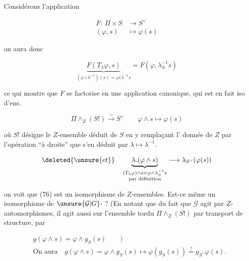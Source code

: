 
Considérons l'application

\[
\begin{aligned}
F:\ \Pi\times S&\longrightarrow S^\vee\\
(\varphi,s)&\longmapsto\varphi(s)
\end{aligned}
\]

on aura donc

\[
\underbrace{F(T_\lambda\varphi,s)}_{(\varphi\circ\lambda^{-1})(s)=\varphi(\lambda^{-1}s}
=F(\varphi,\lambda_S^{-1}s)
\]

ce qui montre que $F$ se factorise en une application canonique, qui est en fait iso d'ens.

\[
\Pi\wedge_Z(S!)\xrightarrow{\sim} S^\vee\qquad\varphi\wedge s\longmapsto\varphi(s) \tag*{(76)}
\]

où $S!$ désigne le $Z$-ensemble déduit de $S$ en y remplaçant l'   donnée  de $Z$ par l'opération ``à droite'' que s'en déduit par $\lambda\longmapsto\lambda^{-1}$.

 

\[
\deleted{\unsure{et}}\quad
\underbrace{\lambda.(\varphi\wedge s)}_{\substack{(T_\lambda\varphi)\wedge s=\varphi\wedge\lambda_S^{-1}s\\\text{par définition}}}
\longrightarrow\lambda_{S^\vee}(\varphi(s))
\]

on voit que (76) est un isomorphisme de $Z$-ensembles.  Est-ce même un isomorphisme de $\unsure{\mathcal G|G}$-  ? (En notant que du fait que $\mathcal G$ agit   par $Z$-automorphismes, il agit aussi sur l'ensemble tordu $\Pi\wedge_Z(S!)$ par transport de structure, par

\[
\begin{aligned}
&g(\varphi\wedge s)=\varphi\wedge g_S(s)\qquad)\\
&\text{On aura}\quad g(\varphi\wedge s)=\varphi\wedge g_S(s)\longmapsto
\varphi(g_S(s))\overset?=g_{S^\vee}\varphi(s).
\end{aligned} \tag*{(77)}
\]

